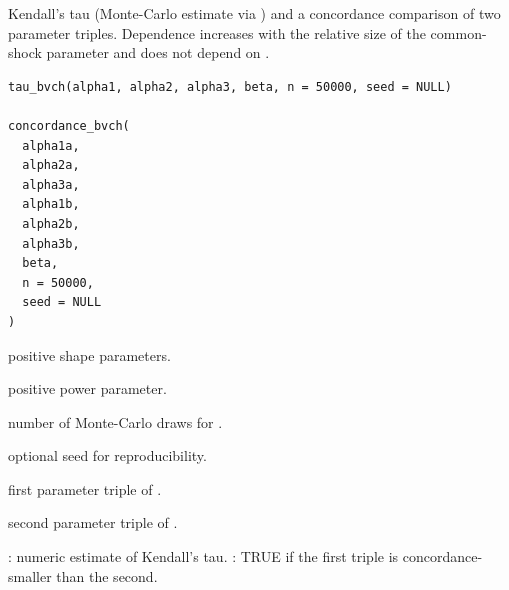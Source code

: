 \documentclass[11pt,a4paper]{article}
\begin{document}
%
\begin{Description}
Kendall's tau (Monte-Carlo estimate via
) and a concordance comparison of
two parameter triples.  Dependence increases with the relative
size of the common-shock parameter  and does not
depend on \eqn{\beta}{}.
\end{Description}
%
\begin{Usage}
\begin{verbatim}
tau_bvch(alpha1, alpha2, alpha3, beta, n = 50000, seed = NULL)

concordance_bvch(
  alpha1a,
  alpha2a,
  alpha3a,
  alpha1b,
  alpha2b,
  alpha3b,
  beta,
  n = 50000,
  seed = NULL
)
\end{verbatim}
\end{Usage}
%
\begin{Arguments}
\begin{ldescription}
\item[\code{alpha1}, \code{alpha2}, \code{alpha3}] positive shape parameters.

\item[\code{beta}] positive power parameter.

\item[\code{n}] number of Monte-Carlo draws for .

\item[\code{seed}] optional seed for reproducibility.

\item[\code{alpha1a}, \code{alpha2a}, \code{alpha3a}] first parameter triple of
.

\item[\code{alpha1b}, \code{alpha2b}, \code{alpha3b}] second parameter triple of
.
\end{ldescription}
\end{Arguments}
%
\begin{Value}
: numeric estimate of Kendall's tau.
: TRUE if the first triple is
concordance-smaller than the second.
\end{Value}


\newpage
\end{document}

